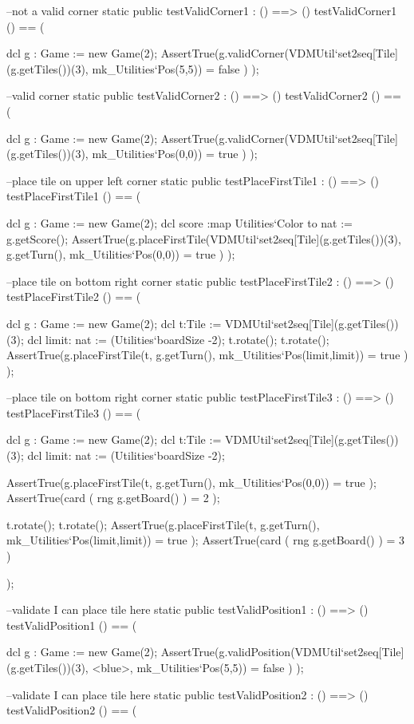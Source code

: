 \begin{vdm_al}
 --not a valid corner
 static public testValidCorner1 : () ==> ()
 testValidCorner1 () == (
  
  dcl g : Game := new Game(2);
  AssertTrue(g.validCorner(VDMUtil`set2seq[Tile](g.getTiles())(3), mk_Utilities`Pos(5,5)) = false )
 );
 
 --valid corner
 static public testValidCorner2 : () ==> ()
 testValidCorner2 () == (
  
  dcl g : Game := new Game(2);
  AssertTrue(g.validCorner(VDMUtil`set2seq[Tile](g.getTiles())(3), mk_Utilities`Pos(0,0)) = true )
 );
 
 --place tile on upper left corner
 static public testPlaceFirstTile1 : () ==> ()
 testPlaceFirstTile1 () == (
  
  dcl g : Game := new Game(2);
  dcl score :map Utilities`Color to nat := g.getScore();
  AssertTrue(g.placeFirstTile(VDMUtil`set2seq[Tile](g.getTiles())(3), g.getTurn(),
       mk_Utilities`Pos(0,0)) = true )
 );
 
 --place tile on bottom right corner
 static public testPlaceFirstTile2 : () ==> ()
 testPlaceFirstTile2 () == (
  
  dcl g : Game := new Game(2);
  dcl t:Tile := VDMUtil`set2seq[Tile](g.getTiles())(3);
  dcl limit: nat := (Utilities`boardSize -2);
  t.rotate();
  t.rotate();
  AssertTrue(g.placeFirstTile(t, g.getTurn(), mk_Utilities`Pos(limit,limit)) = true )
 );
 
 --place tile on bottom right corner
 static public testPlaceFirstTile3 : () ==> ()
 testPlaceFirstTile3 () == (
  
  dcl g : Game := new Game(2);
  dcl t:Tile := VDMUtil`set2seq[Tile](g.getTiles())(3);
  dcl limit: nat := (Utilities`boardSize -2);
  
  AssertTrue(g.placeFirstTile(t, g.getTurn(), mk_Utilities`Pos(0,0)) = true );
  AssertTrue(card ( rng g.getBoard() ) = 2 );
  
  t.rotate();
  t.rotate();
  AssertTrue(g.placeFirstTile(t, g.getTurn(), mk_Utilities`Pos(limit,limit)) = true );
  AssertTrue(card ( rng g.getBoard() ) = 3 )
  
 );
 
 --validate I can place tile here
 static public testValidPosition1 : () ==> ()
 testValidPosition1 () == (
  
  dcl g : Game := new Game(2);
  AssertTrue(g.validPosition(VDMUtil`set2seq[Tile](g.getTiles())(3), <blue>,
        mk_Utilities`Pos(5,5)) = false )
 );
 
 --validate I can place tile here
 static public testValidPosition2 : () ==> ()
 testValidPosition2 () == (
  

\end{vdm_al}
